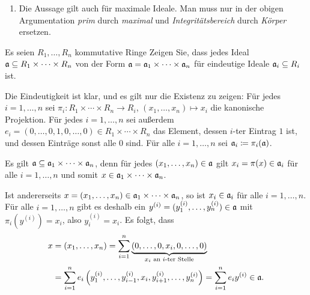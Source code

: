 \begin{solution}
\begin{enumerate}
    \item
      Die Aussage gilt auch für maximale Ideale.
      Man muss nur in der obigen Argumentation \emph{prim} durch \emph{maximal} und \emph{Integritätsbereich} durch \emph{Körper} ersetzen.
  \end{enumerate}
\end{solution}


\begin{question}[subtitle = Ideale in Produkten]
  \label{questions: ideals in products are products of ideal}
  Es seien $R_1, \dotsc, R_n$ kommutative Ringe
  Zeigen Sie, dass jedes Ideal $\mathfrak{a} \subseteq R_1 \times \dotsb \times R_n$ von der Form $\mathfrak{a} = \mathfrak{a}_1 \times \dotsb \times \mathfrak{a}_n$ für eindeutige Ideale $\mathfrak{a}_i \subseteq R_i$ ist.
\end{question}


\begin{solution}
  Die Eindeutigkeit ist klar, und es gilt nur die Existenz zu zeigen:
  Für jedes $i = 1, \dotsc, n$ sei $\pi_i \colon R_1 \times \dotsb \times R_n \to R_i$, $(x_1, \dotsc, x_n) \mapsto x_i$ die kanonische Projektion.
  Für jedes $i = 1, \dotsc, n$ sei außerdem $e_i = (0, \dotsc, 0, 1, 0, \dotsc, 0) \in R_1 \times \dotsb \times R_n$ das Element, dessen $i$-ter Eintrag $1$ ist, und dessen Einträge sonst alle $0$ sind.
  Für alle $i = 1, \dotsc, n$ sei $\mathfrak{a}_i \coloneqq \pi_i(\mathfrak{a})$.
  
  Es gilt $\mathfrak{a} \subseteq \mathfrak{a}_1 \times \dotsb \times \mathfrak{a}_n$, denn für jedes $(x_1, \dotsc, x_n) \in \mathfrak{a}$ gilt $x_i = \pi(x) \in \mathfrak{a}_i$ für alle $i = 1, \dotsc, n$ und somit $x \in \mathfrak{a}_1 \times \dotsb \times \mathfrak{a}_n$.
  
  Ist andererseits $x = (x_1, \dotsc, x_n) \in \mathfrak{a}_1 \times \dotsb \times \mathfrak{a}_n$, so ist $x_i \in \mathfrak{a}_i$ für alle $i = 1, \dotsc, n$.
  Für alle $i = 1, \dotsc, n$ gibt es deshalb ein $y^{(i)} = (y^{(i)}_1, \dotsc, y^{(i)}_n) \in \mathfrak{a}$ mit $\pi_i(y^{(i)}) = x_i$, also $y^{(i)}_i = x_i$.
  Es folgt, dass
  \begin{align*}
        x
    &=  (x_1, \dotsc, x_n)
     =  \sum_{i=1}^n \underbrace{(0, \dotsc, 0, x_i, 0, \dotsc, 0)}_{\text{$x_i$ an $i$-ter Stelle}}
    \\
    &=  \sum_{i=1}^n e_i \left( y^{(i)}_1, \dotsc, y^{(i)}_{i-1}, x_i, y^{(i)}_{i+1}, \dotsc, y^{(i)}_n \right)
     =  \sum_{i=1}^n e_i y^{(i)}
    \in \mathfrak{a}.
  \end{align*}
\end{solution}


